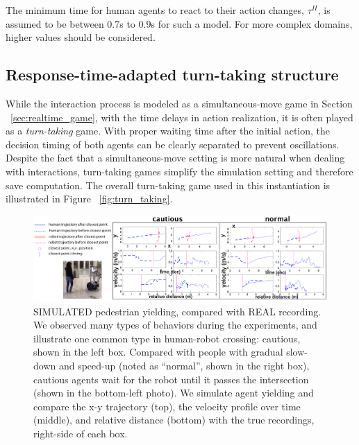 \documentclass[letterpaper, 10 pt, conference]{ieeeconf}  %
\begin{document}
The minimum time for human agents to react to their action changes, $\tau^H$, is assumed to be between $0.7$s to $0.9$s for such a model. For more complex domains, higher values should be considered.

\subsection{Response-time-adapted turn-taking structure}
While the interaction process is modeled as a simultaneous-move game in Section ~\ref{sec:realtime_game}, with the time delays in action realization, it is often played as a \textit{turn-taking} game. With proper waiting time after the initial action, the decision timing of both agents can be clearly separated to prevent oscillations. Despite the fact that a simultaneous-move setting is more natural when dealing with interactions, turn-taking games simplify the simulation setting and therefore save computation. The overall turn-taking game used in this instantiation is illustrated in Figure ~\ref{fig:turn_taking}.

\begin{figure}[t]
      \vspace{-1em}
      \centering
      \hspace{-5em}
      \vspace{-1em}
      \includegraphics[scale=0.48]{iros_exp}
      \hspace{-5em}
      \caption{SIMULATED pedestrian yielding, compared with REAL recording. We observed many types of behaviors during the experiments, and illustrate one common type in human-robot crossing: cautious, shown in the left box. Compared with people with gradual slow-down and speed-up (noted as ``normal'', shown in the right box), cautious agents wait for the robot until it passes the intersection (shown in the bottom-left photo). We simulate agent yielding and compare the x-y trajectory (top), the velocity profile over time (middle), and relative distance (bottom) with the true recordings, right-side of each box.}
      \vspace{-1.7em}
     \label{fig:cautious_recording}
\end{figure}
\end{document}
